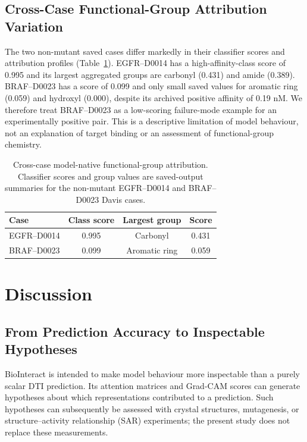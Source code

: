 \documentclass[fleqn,10pt]{wlscirep}
\begin{document}
\subsection{Cross-Case Functional-Group Attribution Variation}

The two non-mutant saved cases differ markedly in their classifier scores and
attribution profiles (Table~\ref{tab:functional_group_comparison}). EGFR--D0014
has a high-affinity-class score of 0.995 and its largest aggregated groups are
carbonyl (0.431) and amide (0.389). BRAF--D0023 has a score of 0.099 and only
\begingroup\color{red}small saved values for aromatic ring (0.059) and hydroxyl
(0.000), despite its archived positive affinity of 0.19 nM. We therefore treat
BRAF--D0023 as a low-scoring failure-mode example for an experimentally positive
pair. This is a descriptive limitation of model behaviour, not an explanation
of target binding or an assessment of functional-group chemistry.\endgroup

\begin{table}[htbp]
\centering
\caption{Cross-case model-native functional-group attribution. Classifier
  scores and group values are saved-output summaries for the non-mutant
  EGFR--D0014 and BRAF--D0023 Davis cases.}
\label{tab:functional_group_comparison}
\begin{tabular}{lccc}
\toprule
\textbf{Case} & \textbf{Class score} & \textbf{Largest group} & \textbf{Score} \\
\midrule
EGFR--D0014 & 0.995 & Carbonyl & 0.431 \\
BRAF--D0023 & 0.099 & Aromatic ring & 0.059 \\
\bottomrule
\end{tabular}
\end{table}

\FloatBarrier
\endgroup

\section{Discussion}
\label{sec:discussion}

\begingroup\color{red}\subsection{From Prediction Accuracy to Inspectable Hypotheses}\endgroup

BioInteract is intended to make model behaviour more inspectable than a purely
scalar DTI prediction.  Its attention matrices and Grad-CAM scores can generate
hypotheses about which representations contributed to a prediction.  Such
hypotheses can subsequently be assessed with crystal structures, mutagenesis,
or structure--activity relationship (SAR) experiments; the present study does
not replace these measurements.
\end{document}
